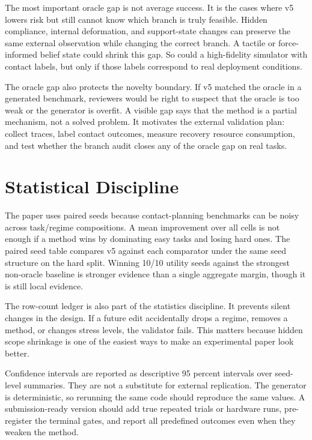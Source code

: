 \documentclass{article}
\begin{document}
The most important oracle gap is not average success. It is the cases where v5 lowers risk but still cannot know which branch is truly feasible. Hidden compliance, internal deformation, and support-state changes can preserve the same external observation while changing the correct branch. A tactile or force-informed belief state could shrink this gap. So could a high-fidelity simulator with contact labels, but only if those labels correspond to real deployment conditions.

The oracle gap also protects the novelty boundary. If v5 matched the oracle in a generated benchmark, reviewers would be right to suspect that the oracle is too weak or the generator is overfit. A visible gap says that the method is a partial mechanism, not a solved problem. It motivates the external validation plan: collect traces, label contact outcomes, measure recovery resource consumption, and test whether the branch audit closes any of the oracle gap on real tasks.

\clearpage
\section{Statistical Discipline}
The paper uses paired seeds because contact-planning benchmarks can be noisy across task/regime compositions. A mean improvement over all cells is not enough if a method wins by dominating easy tasks and losing hard ones. The paired seed table compares v5 against each comparator under the same seed structure on the hard split. Winning 10/10 utility seeds against the strongest non-oracle baseline is stronger evidence than a single aggregate margin, though it is still local evidence.

The row-count ledger is also part of the statistics discipline. It prevents silent changes in the design. If a future edit accidentally drops a regime, removes a method, or changes stress levels, the validator fails. This matters because hidden scope shrinkage is one of the easiest ways to make an experimental paper look better.

Confidence intervals are reported as descriptive 95 percent intervals over seed-level summaries. They are not a substitute for external replication. The generator is deterministic, so rerunning the same code should reproduce the same values. A submission-ready version should add true repeated trials or hardware runs, pre-register the terminal gates, and report all predefined outcomes even when they weaken the method.
\end{document}
